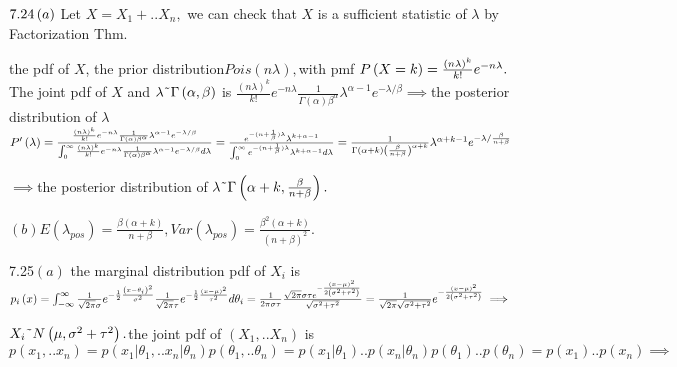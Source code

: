 \documentclass{article}
\begin{document}
$\bigskip 7.24\left( a\right) $ Let $X=X_{1}+..X_{n},$ we can check that $X$
is a sufficient statistic of $\lambda $ by Factorization Thm.

the pdf of $X$, the prior distribution$Pois\left( n\lambda
\right) ,$with pmf $P\left( X=k\right) =\frac{\left( n\lambda \right) ^{k}}{%
k!}e^{-n\lambda }.$ The joint pdf of $X$ and $\lambda \symbol{126}\Gamma
\left( \alpha ,\beta \right) $ is $\frac{\left( n\lambda \right) ^{k}}{k!}%
e^{-n\lambda }\frac{1}{\Gamma \left( \alpha \right) \beta ^{\alpha }}\lambda
^{\alpha -1}e^{-\lambda /\beta }\implies $the posterior distribution of $%
\lambda $ $P^{\prime }\left( \lambda \right) =\frac{\frac{\left( n\lambda
\right) ^{k}}{k!}e^{-n\lambda }\frac{1}{\Gamma \left( \alpha \right) \beta
^{\alpha }}\lambda ^{\alpha -1}e^{-\lambda /\beta }}{\int_{0}^{\infty }\frac{%
\left( n\lambda \right) ^{k}}{k!}e^{-n\lambda }\frac{1}{\Gamma \left( \alpha
\right) \beta ^{\alpha }}\lambda ^{\alpha -1}e^{-\lambda /\beta }d\lambda }=%
\frac{e^{-(n+\frac{1}{\beta })\lambda }\lambda ^{k+\alpha -1}}{%
\int_{0}^{\infty }e^{-(n+\frac{1}{\beta })\lambda }\lambda ^{k+\alpha
-1}d\lambda }=\frac{1}{\Gamma \left( \alpha +k\right) \left( \frac{\beta }{%
n+\beta }\right) ^{\alpha +k}}\lambda ^{\alpha +k-1}e^{-\lambda /\frac{\beta 
}{n+\beta }}$

$\implies $the posterior distribution of $\lambda \symbol{126}\Gamma \left(
\alpha +k,\frac{\beta }{n+\beta }\right) .$

$\left( b\right) E\left( \lambda _{pos}\right) =\frac{\beta \left( \alpha
+k\right) }{n+\beta },Var\left( \lambda _{pos}\right) =\frac{\beta
^{2}\left( \alpha +k\right) }{\left( n+\beta \right) ^{2}}.$

7.25$\left( a\right) $ the marginal distribution pdf of $X_{i}$ is $%
p_{i}\left( x\right) =\int_{-\infty }^{\infty }\frac{1}{\sqrt{2\pi }\sigma }%
e^{-\frac{1}{2}\frac{\left( x-\theta _{i}\right) ^{2}}{\sigma ^{2}}}\frac{1}{%
\sqrt{2\pi }\tau }e^{-\frac{1}{2}\frac{\left( x-\mu \right) ^{2}}{\tau ^{2}}%
}d\theta _{i}=\frac{1}{2\pi \sigma \tau }\frac{\sqrt{2\pi }\sigma \tau e^{-%
\frac{\left( x-\mu \right) ^{2}}{2\left( \sigma ^{2}+\tau ^{2}\right) }}}{%
\sqrt{\sigma ^{2}+\tau ^{2}}}=\allowbreak \frac{1}{\sqrt{2\pi }\sqrt{\sigma
^{2}+\tau ^{2}}}e^{-\frac{\left( x-\mu \right) ^{2}}{2\left( \sigma
^{2}+\tau ^{2}\right) }}\implies $

$X_{i}\symbol{126}N\left( \mu ,\sigma ^{2}+\tau ^{2}\right) .$the joint pdf
of $\left( X_{1},..X_{n}\right) $ is $p\left( x_{1},..x_{n}\right) =p\left(
x_{1}|\theta _{1},..x_{n}|\theta _{n}\right) p\left( \theta _{1},..\theta
_{n}\right) =p\left( x_{1}|\theta _{1}\right) ..p\left( x_{n}|\theta
_{n}\right) p\left( \theta _{1}\right) ..p\left( \theta _{n}\right) =p\left(
x_{1}\right) ..p\left( x_{n}\right) \implies $
\end{document}
